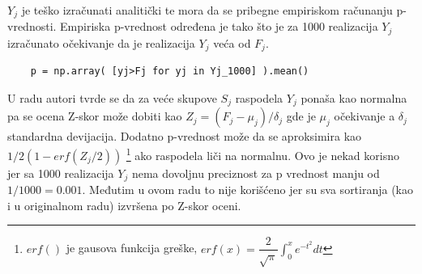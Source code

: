 $Y_j$ je teško izračunati analitički te mora da se pribegne empiriskom
računanju p-vrednosti. Empiriska p-vrednost određena je tako što je za 1000
realizacija $Y_j$ izračunato očekivanje da je realizacija $Y_j$ veća od $F_j$.
\begin{verbatim}
    p = np.array( [yj>Fj for yj in Yj_1000] ).mean()
\end{verbatim}
U radu \parencite{Xie2007} autori tvrde se da za veće skupove $S_j$ raspodela
$Y_j$ ponaša kao normalna pa se ocena Z-skor može dobiti kao
$Z_j=(F_j-\mu_j)/\delta_j$ gde je $\mu_j$ očekivanje a $\delta_j$ standardna
devijacija.  Dodatno p-vrednost može da se aproksimira kao $1/2(1-erf(Z_j/2))$
\footnote{$erf()$ je gausova funkcija greške,
$erf(x)=\dfrac{2}{\sqrt{\pi}} \int_{0}^{x}  e^{-t^2} dt$ }
ako raspodela liči na normalnu. Ovo je nekad korisno jer sa 1000 realizacija
$Y_j$ nema dovoljnu preciznost za p vrednost manju od $1/1000=0.001$. Međutim u
ovom radu to nije korišćeno jer su sva sortiranja (kao i u originalnom radu)
izvršena po Z-skor oceni.


